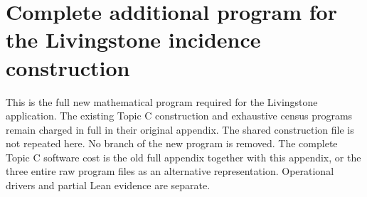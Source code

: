\documentclass[11pt,a4paper]{article}
\begin{document}
\section*{Complete additional program for the Livingstone incidence construction}
This is the full new mathematical program required for the Livingstone application. The existing Topic C construction and exhaustive census programs remain charged in full in their original appendix. The shared construction file is not repeated here. No branch of the new program is removed. The complete Topic C software cost is the old full appendix together with this appendix, or the three entire raw program files as an alternative representation. Operational drivers and partial Lean evidence are separate.
\end{document}
